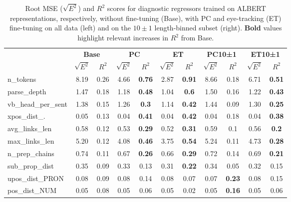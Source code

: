 \documentclass[a4paper, nobind]{templates/ociamthesis}
\begin{document}
\begin{table}

\caption{\label{tab:probes}Root MSE ($\sqrt{E^2}$) and $R^2$ scores for diagnostic regressors trained on ALBERT representations, respectively, without fine-tuning (Base), with PC and eye-tracking (ET) fine-tuning on all data (left) and on the $10 \pm 1$ length-binned subset (right). \textbf{Bold} values highlight relevant increases in $R^2$ from Base.}
\centering
\fontsize{11}{13}\selectfont
\begin{tabular}[t]{lccccc>{}c|cccc}
\toprule
\multicolumn{1}{c}{\textbf{ }} & \multicolumn{2}{c}{\textbf{Base}} & \multicolumn{2}{c}{\textbf{PC}} & \multicolumn{2}{c}{\textbf{ET}} & \multicolumn{2}{c}{\textbf{PC10±1}} & \multicolumn{2}{c}{\textbf{ET10±1}} \\
\cmidrule(l{3pt}r{3pt}){2-3} \cmidrule(l{3pt}r{3pt}){4-5} \cmidrule(l{3pt}r{3pt}){6-7} \cmidrule(l{3pt}r{3pt}){8-9} \cmidrule(l{3pt}r{3pt}){10-11}
 & $\sqrt{E^2}$ & $R^2$ & $\sqrt{E^2}$ & $R^2$ & $\sqrt{E^2}$ & $R^2$ & $\sqrt{E^2}$ & $R^2$ & $\sqrt{E^2}$ & $R^2$\\
\midrule
n\_tokens & 8.19 & 0.26 & 4.66 & \textbf{0.76} & 2.87 & \textbf{0.91} & 8.66 & 0.18 & 6.71 & \textbf{0.51}\\
parse\_depth & 1.47 & 0.18 & 1.18 & \textbf{0.48} & 1.04 & \textbf{0.6} & 1.50 & 0.16 & 1.22 & \textbf{0.43}\\
vb\_head\_per\_sent & 1.38 & 0.15 & 1.26 & \textbf{0.3} & 1.14 & \textbf{0.42} & 1.44 & 0.09 & 1.30 & \textbf{0.25}\\
xpos\_dist\_. & 0.05 & 0.13 & 0.04 & \textbf{0.41} & 0.04 & \textbf{0.42} & 0.04 & 0.18 & 0.04 & \textbf{0.38}\\
avg\_links\_len & 0.58 & 0.12 & 0.53 & \textbf{0.29} & 0.52 & \textbf{0.31} & 0.59 & 0.1 & 0.56 & \textbf{0.2}\\
max\_links\_len & 5.20 & 0.12 & 4.08 & \textbf{0.46} & 3.75 & \textbf{0.54} & 5.24 & 0.11 & 4.73 & \textbf{0.28}\\
n\_prep\_chains & 0.74 & 0.11 & 0.67 & \textbf{0.26} & 0.66 & \textbf{0.29} & 0.72 & 0.14 & 0.69 & \textbf{0.21}\\
sub\_prop\_dist & 0.35 & 0.09 & 0.33 & 0.13 & 0.31 & \textbf{0.22} & 0.34 & 0.05 & 0.32 & 0.15\\
upos\_dist\_PRON & 0.08 & 0.09 & 0.08 & 0.14 & 0.08 & 0.07 & 0.07 & \textbf{0.23} & 0.08 & 0.15\\
pos\_dist\_NUM & 0.05 & 0.08 & 0.05 & 0.06 & 0.05 & 0.02 & 0.05 & \textbf{0.16} & 0.05 & 0.06\\

\end{tabular}
\end{table}
\end{document}
